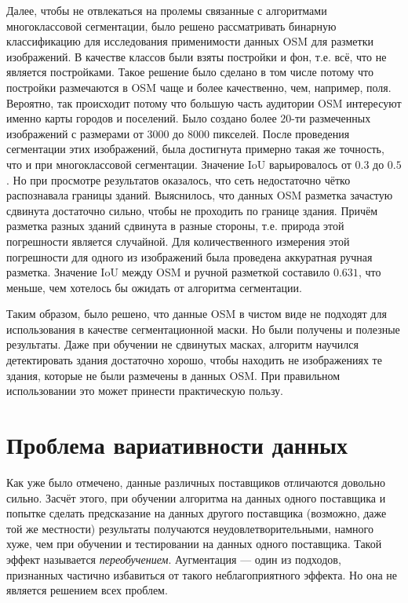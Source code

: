 Далее, чтобы не отвлекаться на пролемы связанные с алгоритмами многоклассовой
сегментации, было решено рассматривать бинарную классификацию для исследования
применимости данных OSM для разметки изображений. В качестве классов были взяты
постройки и фон, т.е. всё, что не является постройками. Такое решение было
сделано в том числе потому что постройки размечаются в OSM чаще и более
качественно, чем, например, поля. Вероятно, так происходит потому что большую
часть аудитории OSM интересуют именно карты городов и поселений.
Было создано более $20$-ти размеченных изображений с размерами от $3000$ до
$8000$ пикселей. После проведения сегментации этих изображений, была достигнута
примерно такая же точность, что и при многоклассовой сегментации. Значение IoU
варьировалось от $0.3$ до $0.5$.
Но при просмотре результатов оказалось, что сеть недостаточно чётко распознавала
границы зданий. Выяснилось, что данных OSM разметка зачастую сдвинута достаточно
сильно, чтобы не проходить по границе здания. Причём разметка разных зданий
сдвинута в разные стороны, т.е. природа этой погрешности является случайной.
Для количественного измерения этой погрешности для одного из изображений была
проведена аккуратная ручная разметка. Значение IoU между OSM и ручной разметкой
составило $0.631$, что меньше, чем хотелось бы ожидать от алгоритма сегментации.

Таким образом, было решено, что данные OSM в чистом виде не подходят для
использования в качестве сегментационной маски. Но были получены и полезные
результаты. Даже при обучении не сдвинутых масках, алгоритм научился
детектировать здания достаточно хорошо, чтобы находить не изображениях те здания,
которые не были размечены в данных OSM. При правильном использовании это может
принести практическую пользу.


\section{Проблема вариативности данных}
Как уже было отмечено, данные различных поставщиков отличаются довольно сильно.
Засчёт этого, при обучении алгоритма на данных одного поставщика и попытке
сделать предсказание на данных другого поставщика (возможно, даже той же
местности) результаты получаются неудовлетворительными, намного хуже, чем при
обучении и тестировании на данных одного поставщика. Такой эффект называется
\textit{переобучением}. Аугментация --- один из подходов, признанных частично
избавиться от такого неблагоприятного эффекта. Но она не является решением всех
проблем.

